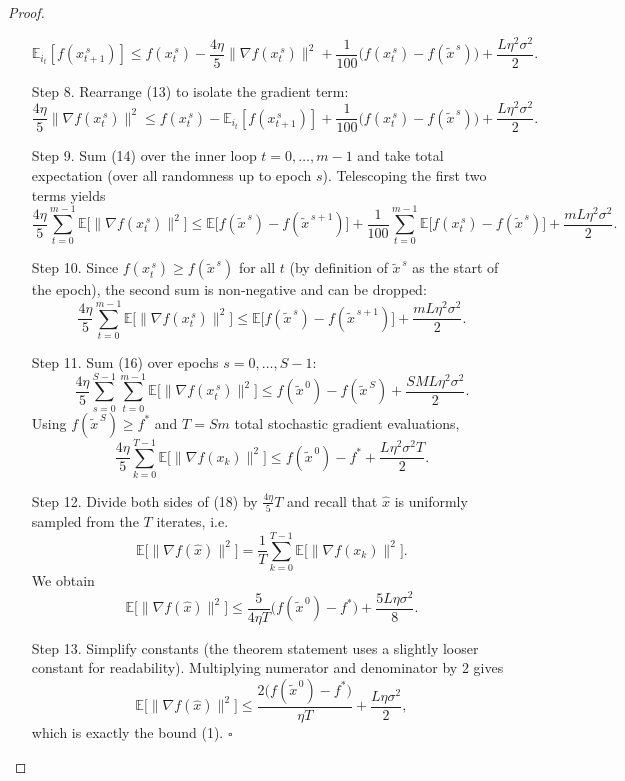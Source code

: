 \documentclass[11pt]{article}
\newcommand{\EE}{\mathbb{E}}
\newcommand{\grad}{\nabla}
\begin{document}
\begin{proof}
\begin{enumerate}
\[
\EE_{i_t}[f(x_{t+1}^{\,s})]\le
f(x_t^{\,s})-\frac{4\eta}{5}\|\grad f(x_t^{\,s})\|^{2}
+\frac{1}{100}\big(f(x_t^{\,s})-f(\tilde{x}^{\,s})\big)
+\frac{L\eta^{2}\sigma^{2}}{2}.
\tag{13}
\]
\item[Step 8.] Rearrange (13) to isolate the gradient term:
\[
\frac{4\eta}{5}\|\grad f(x_t^{\,s})\|^{2}
\le
f(x_t^{\,s})- \EE_{i_t}[f(x_{t+1}^{\,s})]
+\frac{1}{100}\big(f(x_t^{\,s})-f(\tilde{x}^{\,s})\big)
+\frac{L\eta^{2}\sigma^{2}}{2}.
\tag{14}
\]
\item[Step 9.] Sum (14) over the inner loop $t=0,\dots,m-1$ and take total expectation (over all randomness up to epoch $s$). Telescoping the first two terms yields
\[
\frac{4\eta}{5}\sum_{t=0}^{m-1}\EE\!\big[\|\grad f(x_t^{\,s})\|^{2}\big]
\le
\EE\!\big[f(\tilde{x}^{\,s})-f(\tilde{x}^{\,s+1})\big]
+\frac{1}{100}\sum_{t=0}^{m-1}\EE\!\big[f(x_t^{\,s})-f(\tilde{x}^{\,s})\big]
+\frac{mL\eta^{2}\sigma^{2}}{2}.
\tag{15}
\]
\item[Step 10.] Since $f(x_t^{\,s})\ge f(\tilde{x}^{\,s})$ for all $t$ (by definition of $\tilde{x}^{\,s}$ as the start of the epoch), the second sum is non‑negative and can be dropped:
\[
\frac{4\eta}{5}\sum_{t=0}^{m-1}\EE\!\big[\|\grad f(x_t^{\,s})\|^{2}\big]
\le
\EE\!\big[f(\tilde{x}^{\,s})-f(\tilde{x}^{\,s+1})\big]
+\frac{mL\eta^{2}\sigma^{2}}{2}.
\tag{16}
\]
\item[Step 11.] Sum (16) over epochs $s=0,\dots,S-1$:
\[
\frac{4\eta}{5}\sum_{s=0}^{S-1}\sum_{t=0}^{m-1}
\EE\!\big[\|\grad f(x_t^{\,s})\|^{2}\big]
\le
f(\tilde{x}^{\,0})-f(\tilde{x}^{\,S})
+\frac{SM L\eta^{2}\sigma^{2}}{2}.
\tag{17}
\]
Using $f(\tilde{x}^{\,S})\ge f^{*}$ and $T=Sm$ total stochastic gradient evaluations,
\[
\frac{4\eta}{5}\sum_{k=0}^{T-1}\EE\!\big[\|\grad f(x_k)\|^{2}\big]
\le
f(\tilde{x}^{\,0})-f^{*}
+\frac{L\eta^{2}\sigma^{2}T}{2}.
\tag{18}
\]
\item[Step 12.] Divide both sides of (18) by $\frac{4\eta}{5}T$ and recall that $\hat{x}$ is uniformly sampled from the $T$ iterates, i.e. 
\[
\EE\!\big[\|\grad f(\hat{x})\|^{2}\big]=\frac1T\sum_{k=0}^{T-1}\EE\!\big[\|\grad f(x_k)\|^{2}\big].
\]
We obtain
\[
\EE\!\big[\|\grad f(\hat{x})\|^{2}\big]
\le
\frac{5}{4\eta T}\big(f(\tilde{x}^{\,0})-f^{*}\big)
+\frac{5L\eta\sigma^{2}}{8}.
\tag{19}
\]
\item[Step 13.] Simplify constants (the theorem statement uses a slightly looser constant for readability). Multiplying numerator and denominator by $2$ gives
\[
\EE\!\big[\|\grad f(\hat{x})\|^{2}\big]
\le
\frac{2\big(f(\tilde{x}^{\,0})-f^{*}\big)}{\eta T}
+\frac{L\eta\sigma^{2}}{2},
\tag{20}
\]
which is exactly the bound (1). \hfill $\square$
\end{enumerate}
\end{proof}
\end{document}
